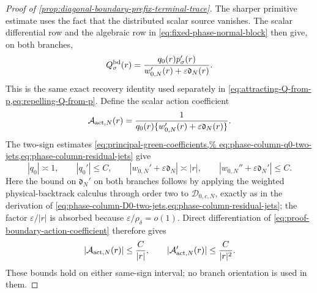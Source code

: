 \begin{proof}[Proof of
\cref{prop:diagonal-boundary-prefix-terminal-trace}]
The sharper primitive estimate uses the fact that the distributed scalar
source vanishes.  The scalar differential row and the algebraic row in
\cref{eq:fixed-phase-normal-block} then give, on both branches,
\begin{equation}
 Q_\sigma^{\rm bd}(r)
 =\frac{q_0(r)p_\sigma'(r)}
        {w_{0,N}'(r)+\varepsilon\mathfrak d_N(r)}.            \label{eq:proof-boundary-Q-from-p}
\end{equation}
This is the same exact recovery identity used separately in
\cref{eq:attracting-Q-from-p,eq:repelling-Q-from-p}.  Define the scalar
action coefficient
\begin{equation}
 \mathcal A_{{\rm act},N}(r)=\frac1{q_0(r)
        \{w_{0,N}'(r)+\varepsilon\mathfrak d_N(r)\}}.         \label{eq:proof-boundary-action-coefficient}
\end{equation}
The two-sign estimates
\cref{eq:principal-green-coefficients,%
eq:phase-column-q0-two-jets,eq:phase-column-residual-jets} give
\begin{equation*}
 |q_0|\asymp1,\qquad |q_0'|\le C,\qquad
 |w_{0,N}'+\varepsilon\mathfrak d_N|\asymp |r|,
 \qquad
 |w_{0,N}''+\varepsilon\mathfrak d_N'|\le C.
\end{equation*}
Here the bound on \(\mathfrak d_N'\) on both branches follows by applying
the weighted physical-backtrack calculus through order two to
\(\mathcal D_{0,c,N}\), exactly as in the derivation of
\cref{eq:phase-column-D0-two-jets,eq:phase-column-residual-jets}; the factor
\(\varepsilon/|r|\) is absorbed because
\(\varepsilon/\rho_\delta=o(1)\).  Direct differentiation of
\cref{eq:proof-boundary-action-coefficient} therefore gives
\begin{equation}
 |\mathcal A_{{\rm act},N}(r)|\le\frac C{|r|},\qquad
 |\mathcal A_{{\rm act},N}'(r)|\le\frac C{|r|^2}.          \label{eq:proof-boundary-action-coefficient-bounds}
\end{equation}
These bounds hold on either same-sign interval; no branch orientation is
used in them.


\end{proof}
